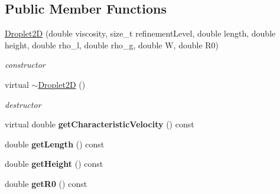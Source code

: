 \subsection*{Public Member Functions}
\begin{DoxyCompactItemize}
\item 
\hypertarget{classnatrium_1_1Droplet2D_a10396d0258e6a3a60501c45afa33d39f}{
\hyperlink{classnatrium_1_1Droplet2D_a10396d0258e6a3a60501c45afa33d39f}{Droplet2D} (double viscosity, size\_\-t refinementLevel, double length, double height, double rho\_\-l, double rho\_\-g, double W, double R0)}
\label{classnatrium_1_1Droplet2D_a10396d0258e6a3a60501c45afa33d39f}

\begin{DoxyCompactList}\small\item\em constructor \item\end{DoxyCompactList}\item 
\hypertarget{classnatrium_1_1Droplet2D_a3784c41c6af571743aa168a9a19fe55c}{
virtual \hyperlink{classnatrium_1_1Droplet2D_a3784c41c6af571743aa168a9a19fe55c}{$\sim$Droplet2D} ()}
\label{classnatrium_1_1Droplet2D_a3784c41c6af571743aa168a9a19fe55c}

\begin{DoxyCompactList}\small\item\em destructor \item\end{DoxyCompactList}\item 
\hypertarget{classnatrium_1_1Droplet2D_a3dfc91902f1a808ef5f3e83dfa833aef}{
virtual double {\bfseries getCharacteristicVelocity} () const }
\label{classnatrium_1_1Droplet2D_a3dfc91902f1a808ef5f3e83dfa833aef}

\item 
\hypertarget{classnatrium_1_1Droplet2D_a5d4684792586ebd07bf95439d2e35829}{
double {\bfseries getLength} () const }
\label{classnatrium_1_1Droplet2D_a5d4684792586ebd07bf95439d2e35829}

\item 
\hypertarget{classnatrium_1_1Droplet2D_a82508d3bc7b679b4961b1b9130756f32}{
double {\bfseries getHeight} () const }
\label{classnatrium_1_1Droplet2D_a82508d3bc7b679b4961b1b9130756f32}

\item 
\hypertarget{classnatrium_1_1Droplet2D_aa739aeb767deb28364782bb624589772}{
double {\bfseries getR0} () const }
\label{classnatrium_1_1Droplet2D_aa739aeb767deb28364782bb624589772}


\end{DoxyCompactItemize}
